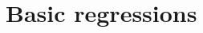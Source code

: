 \documentclass[10pt]{beamer}
\newcommand{\beqns}{ \begin{eqnarray*} }
\newcommand{\eeqns}{ \end{eqnarray*} }
\newcommand{\bitem}{\begin{itemize}}
\newcommand{\eitem}{\end{itemize}}
\begin{document}
%

%

%	

%	


\section{Basic regressions}

\end{document}
